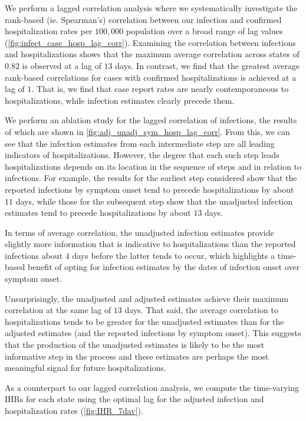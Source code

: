 \documentclass{article}
\begin{document}
We perform a lagged correlation analysis where we systematically investigate the
rank-based (ie. Spearman's) correlation between our infection and confirmed
hospitalization rates per $100,000$ population over a broad range of lag values
(\autoref{fig:infect_case_hosp_lag_corr}). Examining the correlation between infections and
hospitalizations shows that the maximum average correlation across states of $0.82$ is 
observed at a lag of $13$ days. In contrast, we find that the greatest average
rank-based correlations for cases with confirmed hospitalizations is achieved at a lag of
$1$. That is, we find that case report rates are nearly contemporaneous to
hospitalizations, while infection estimates clearly precede them. 

We perform an ablation study for the lagged correlation of infections, the results of which are 
shown in \autoref{fig:adj_unadj_sym_hosp_lag_corr}. From this, we can see that the infection estimates from each intermediate 
step are all leading indicators of hospitalizations. However, the degree that each such step 
leads hospitalizations depends on its location in the sequence of steps and in relation to 
infections. For example, the results for the earliest step considered show that the 
reported infections by symptom onset tend to precede hospitalizations by about $11$
days, while those for the subsequent step show that the unadjusted infection estimates
tend to precede hospitalizations by about $13$ days.

In terms of average correlation, the unadjusted infection estimates provide slightly more
information that is indicative to hospitalizations than the reported infections about $4$ 
days before the latter tends to occur, which highlights a time-based benefit of opting for
infection estimates by the dates of infection onset over symptom onset. 

Unsurprisingly, the unadjusted and adjusted estimates achieve their maximum correlation
at the same lag of $13$ days. That said, the average correlation to hospitalizations
tends to be greater for the unadjusted estimates than for the adjusted estimates (and
the reported infections by symptom onset). This suggests that the production of the
unadjusted estimates is likely to be the most informative step in the process and
these estimates are perhaps the most meaningful signal for future hospitalizations.

As a counterpart to our lagged correlation analysis, we compute the time-varying IHRs 
for each state using the optimal lag for the adjusted infection and hospitalization rates 
(\autoref{fig:IHR_7dav}). 
\end{document}
